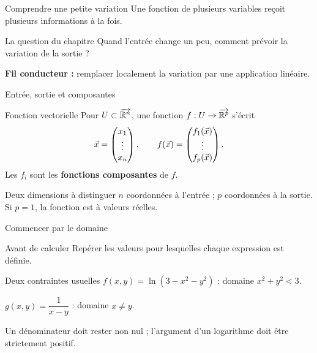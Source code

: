 \begin{frame}[t]{Comprendre une petite variation}
\coursanalyse
Une fonction de plusieurs variables reçoit plusieurs informations à la fois.
\begin{cours}{La question du chapitre}
Quand l'entrée change un peu, comment prévoir la variation de la sortie ?
\end{cours}
\begin{center}\end{center}
\vfill\textbf{Fil conducteur :} remplacer localement la variation par une application linéaire.
\end{frame}

\begin{frame}[t]{Entrée, sortie et composantes}
\coursanalyse
\begin{notion}{Fonction vectorielle}
Pour $U\subset\overrightarrow{\mathbb R^{n}}$, une fonction $f:U\to\overrightarrow{\mathbb R^{p}}$ s'écrit
\[\vec x=\begin{pmatrix}x_1\\\vdots\\x_n\end{pmatrix},\qquad f(\vec x)=\begin{pmatrix}f_1(\vec x)\\\vdots\\f_p(\vec x)\end{pmatrix}.\]
Les $f_i$ sont les \textbf{fonctions composantes} de $f$.
\end{notion}
\begin{resultat}{Deux dimensions à distinguer}
$n$ coordonnées à l'entrée ; $p$ coordonnées à la sortie. Si $p=1$, la fonction est à valeurs réelles.
\end{resultat}
\end{frame}

\begin{frame}[t]{Commencer par le domaine}
\coursanalyse
\begin{cours}{Avant de calculer}
Repérer les valeurs pour lesquelles chaque expression est définie.
\end{cours}
\begin{exemple}{Deux contraintes usuelles}
$f(x,y)=\ln(3-x^2-y^2)$ : domaine $x^2+y^2<3$.

\medskip
$g(x,y)=\dfrac1{x-y}$ : domaine $x\ne y$.
\end{exemple}
\vfill Un dénominateur doit rester non nul ; l'argument d'un logarithme doit être strictement positif.
\end{frame}

